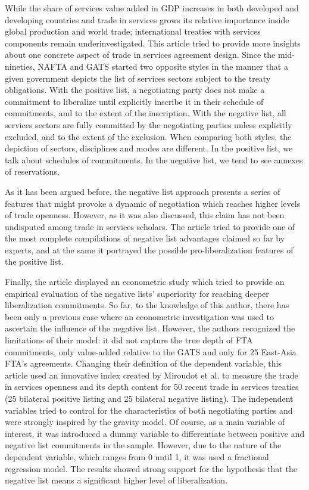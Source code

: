 \documentclass{article}
\begin{document}
While the share of services value added in GDP increases in both developed and developing countries and trade in services grows its relative importance inside global production and world trade; international treaties with services components remain underinvestigated. This article tried to provide more insights about one concrete aspect of trade in services agreement design. Since the mid-nineties, NAFTA and GATS started two opposite styles in the manner that a given government depicts the list of services sectors subject to the treaty obligations. With the positive list, a negotiating party does not make a commitment to liberalize until explicitly inscribe it in their schedule of commitments, and to the extent of the inscription. With the negative list, all services sectors are fully committed by the negotiating parties unless explicitly excluded, and to the extent of the exclusion. When comparing both styles, the depiction of sectors, disciplines and modes are different. In the positive list, we talk about schedules of commitments. In the negative list, we tend to see annexes of reservations.

\smallskip

As it has been argued before, the negative list approach presents a series of features that might provoke a dynamic of negotiation which reaches higher levels of trade openness. However, as it was also discussed, this claim has not been undisputed among trade in services scholars. The article tried to provide one of the most complete compilations of negative list advantages claimed so far by experts, and at the same it portrayed the possible pro-liberalization features of the positive list.

\smallskip

Finally, the article displayed an econometric study which tried to provide an empirical evaluation of the negative lists’ superiority for reaching deeper liberalization commitments. So far, to the knowledge of this author, there has been only a previous case where an econometric investigation was used to ascertain the influence of the negative list. However, the authors recognized the limitations of their model: it did not capture the true depth of FTA commitments, only value-added relative to the GATS and only for 25 East-Asia FTA’s agreements. Changing their definition of the dependent variable, this article used an innovative index created by Miroudot et al. to measure the trade in services openness and its depth content for 50 recent trade in services treaties (25 bilateral positive listing and 25 bilateral negative listing). The independent variables tried to control for the characteristics of both negotiating parties and were strongly inspired by the gravity model. Of course, as a main variable of interest, it was introduced a dummy variable to differentiate between positive and negative list commitments in the sample. However, due to the nature of the dependent variable, which ranges from 0 until 1, it was used a fractional regression model. The results showed strong support for the hypothesis that the negative list means a significant higher level of liberalization.
\end{document}
